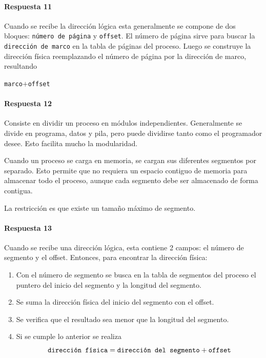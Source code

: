 \paragraph{Respuesta 11}
Cuando se recibe la dirección lógica esta generalmente se compone de dos bloques: \texttt{número de página} y \texttt{offset}. El número de página sirve para buscar la \texttt{dirección de marco} en la tabla de páginas del proceso. Luego se construye la dirección física reemplazando el número de página por la dirección de marco, resultando
\begin{center}
  \texttt{marco}\(+\)\texttt{offset}
\end{center}

\paragraph{Respuesta 12}
Consiste en dividir un proceso en módulos independientes. Generalmente se divide en programa, datos y pila, pero puede dividirse tanto como el programador desee. Esto facilita mucho la modularidad.

Cuando un proceso se carga en memoria, se cargan sus diferentes segmentos por separado. Esto permite que no requiera un espacio contiguo de memoria para almacenar todo el proceso, aunque cada segmento debe ser almacenado de forma contigua.

La restricción es que existe un tamaño máximo de segmento.

\paragraph{Respuesta 13}
Cuando se recibe una dirección lógica, esta contiene 2 campos: el número de segmento y el offset. Entonces, para encontrar la dirección física:
\begin{enumerate}
  \item Con el número de segmento se busca en la tabla de segmentos del proceso el puntero del inicio del segmento y la longitud del segmento.
  \item Se suma la dirección física del inicio del segmento con el offset.
  \item Se verifica que el resultado sea menor que la longitud del segmento.
  \item Si se cumple lo anterior se realiza 
    \[
      \text{\texttt{dirección física}}=\text{\texttt{dirección del segmento}} + \text{\texttt{offset}}
    \]
\end{enumerate}

